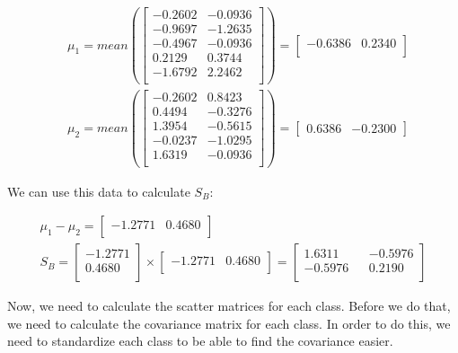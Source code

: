 \documentclass[12pt]{article}
\begin{document}
\begin{center}
    \begin{align}
        &\mu_{1} = mean\left(\begin{bmatrix}
            -0.2602 & -0.0936\\
            -0.9697 & -1.2635\\
            -0.4967 & -0.0936\\
            0.2129 & 0.3744\\
            -1.6792 & 2.2462\\
        \end{bmatrix}\right)
        =
        \begin{bmatrix}
            -0.6386 & 0.2340\\
        \end{bmatrix} \label{mean1} \\
        &\mu_{2} = mean\left(\begin{bmatrix}
            -0.2602 & 0.8423\\
            0.4494 & -0.3276\\
            1.3954 & -0.5615\\
            -0.0237 & -1.0295\\
            1.6319 & -0.0936\\
        \end{bmatrix}\right)
        =
        \begin{bmatrix}
            0.6386 & -0.2300
        \end{bmatrix}\label{mean2}
    \end{align}
\end{center}

We can use this data to calculate $S_{B}$:
\begin{center}
    \begin{gather}
        \mu_{1} - \mu_2 =
        \begin{bmatrix}
            -1.2771 & 0.4680\\
        \end{bmatrix} \nonumber \\
        S_{B} = \begin{bmatrix}
            -1.2771\\
            0.4680\\
        \end{bmatrix}
        \times
        \begin{bmatrix}
            -1.2771 & 0.4680\\
        \end{bmatrix}
        =
        \begin{bmatrix}
            1.6311 && -0.5976\\
            -0.5976 && 0.2190\\
        \end{bmatrix}
    \end{gather}
\end{center}
Now, we need to calculate the scatter matrices for each class. Before we do that, we need to calculate the covariance matrix for each class. In order to do this, we need to standardize each class to be able to find the covariance easier.
\end{document}
